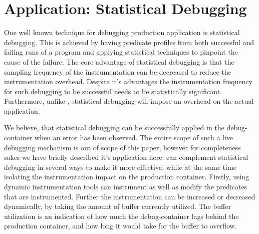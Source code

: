 \section{Application: Statistical Debugging}
\label{statistical}


One well known technique for debugging production application is statistical debugging. 
This is achieved by having predicate profiles from both successful and failing runs of a program and applying statistical techniques to pinpoint the cause of the failure.
The core advantage of statistical debugging is that the sampling frequency of the instrumentation can be decreased to reduce the instrumentation overhead.
Despite it's advantages the instrumentation frequency for such debugging to be successful needs to be statistically significant. 
Furthermore, unlike \parikshan, statistical debugging will impose an overhead on the actual application. 

We believe, that statistical debugging can be successfully applied in the debug-container when an error has been observed. 
The entire scope of such a live debugging mechanism is out of scope of this paper, however for completeness sakes we have briefly described it's application here. 
\parikshan can complement statistical debugging in several ways to make it more effective, while at the same time isolating the instrumentation impact on the production container.
Firstly, using dynamic instrumentation tools \parikshan can instrument as well as modify the predicates that are instrumented.
Further the instrumentation can be increased or decreased dynamically, by taking the amount of buffer currently utilized. 
The buffer utilization is an indication of how much the debug-container lags behind the production container, and how long it would take for the buffer to overflow.

